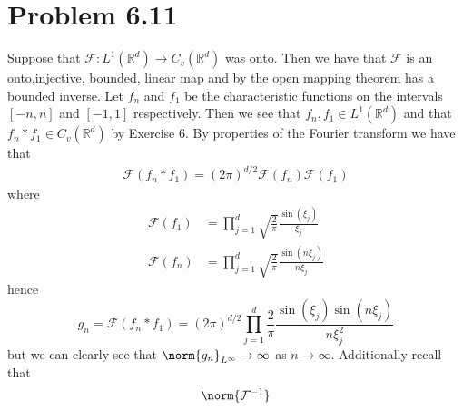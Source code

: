\documentclass[12pt]{report}
\begin{document}
\section*{Problem 6.11}
Suppose that $\mathcal{F}: L^1(\mathbb{R}^d) \to C_v(\mathbb{R}^d)$ was onto. Then we have that $\mathcal{F}$ is an onto,injective, bounded, linear map and by the open mapping theorem has a bounded inverse. Let $f_n$ and $f_1$ be the characteristic functions on the intervals $[-n,n]$ and $[-1,1]$ respectively. Then we see that $f_n,f_1 \in L^1(\mathbb{R}^d)$ and that $f_n * f_1 \in C_v(\mathbb{R}^d)$ by Exercise $6$. By properties of the Fourier transform we have that
\begin{align*}
  \mathcal{F}(f_n * f_1) = (2\pi)^{d/2}\mathcal{F}(f_n)\mathcal{F}(f_1)
\end{align*}
where 
\begin{align*}
  \mathcal{F}(f_1) &= \prod_{j=1}^d \sqrt{\frac{2}{\pi}} \frac{\sin(\xi_j)}{\xi_j} \\
  \mathcal{F}(f_n) &= \prod_{j=1}^d \sqrt{\frac{2}{\pi}} \frac{\sin(n\xi_j)}{n\xi_j}
\end{align*}
hence 
\begin{equation*}
g_n = \mathcal{F}(f_n * f_1) = (2\pi)^{d/2}\prod_{j=1}^d \frac{2}{\pi} \frac{\sin(\xi_j)\sin(n\xi_j)}{n\xi_j^2}
\end{equation*}
but we can clearly see that $\norm{g_n}_{L^\infty} \to \infty$ as $n \to \infty$. Additionally recall that
\begin{equation*}
  \norm{\mathcal{F}^{-1}}
\end{equation*}
\end{document}
